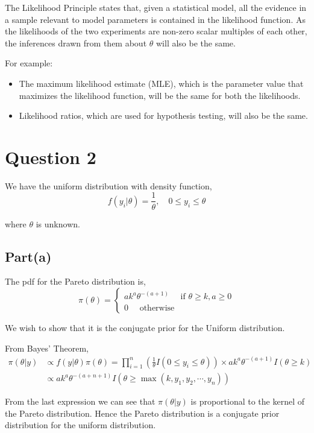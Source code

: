 \documentclass[a4paper]{article}
\begin{document}
The Likelihood Principle states that, given a statistical model, all the evidence in a sample relevant to model parameters is contained in the likelihood function. As the likelihoods of the two experiments are non-zero scalar multiples of each other, the inferences drawn from them about $\theta$ will also be the same.

For example:
\begin{itemize}
    \item The maximum likelihood estimate (MLE), which is the parameter value that maximizes the likelihood function, will be the same for both the likelihoods.
    \item Likelihood ratios, which are used for hypothesis testing, will also be the same.
\end{itemize}

\newpage

\section*{Question 2}

We have the uniform distribution with density function,
\[f(y_i|\theta) = \frac{1}{\theta}, \quad 0 \leq y_i \leq \theta \]

where \(\theta\) is unknown.

\subsection*{Part(a)}

The pdf for the Pareto distribution is,
\[\displaystyle
    \pi(\theta) = \begin{cases}
        a k^{a} \theta^{-(a+1)} \quad \text{ if } \theta \geq k, a \geq 0\\
        0 \quad \text{ otherwise }
    \end{cases}
\]

We wish to show that it is the conjugate prior for the Uniform distribution.

From Bayes' Theorem,
\begin{align*}
    \pi(\theta|y) &\propto f(y|\theta) \pi(\theta) 
                = \prod_{i=1}^{n}\left(\frac{1}{\theta}I(0\leq y_i\leq\theta) \right) \times a k^{a} \theta^{-(a+1)} I(\theta \geq k) \\
     &\propto a k^{a} \theta^{-(a+n+1)} I(\theta \geq \max(k,y_1,y_2,\cdots,y_n))
\end{align*}

From the last expression we can see that \(\pi(\theta|y)\) is proportional to the kernel of the Pareto distribution. Hence the Pareto distribution is a conjugate prior distribution for the uniform distribution.
\end{document}
